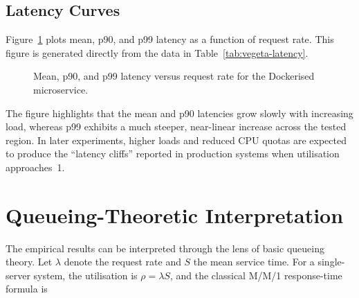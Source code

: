 \subsection{Latency Curves}

Figure~\ref{fig:latency-vs-load} plots mean, p90, and p99 latency as a
function of request rate. This figure is generated directly from the
data in Table~\ref{tab:vegeta-latency}.

\begin{figure}[h]
\centering
{}
\caption{Mean, p90, and p99 latency versus request rate for the
Dockerised microservice.}
\label{fig:latency-vs-load}
\end{figure}

The figure highlights that the mean and p90 latencies grow slowly with
increasing load, whereas p99 exhibits a much steeper, near-linear
increase across the tested region. In later experiments, higher loads
and reduced CPU quotas are expected to produce the ``latency cliffs''
reported in production systems when utilisation approaches~1.

\section{Queueing-Theoretic Interpretation}
\label{sec:prelim-qt}

The empirical results can be interpreted through the lens of basic
queueing theory. Let $\lambda$ denote the request rate and $S$ the mean
service time. For a single-server system, the utilisation is
$\rho = \lambda S$, and the classical M/M/1 response-time formula is

